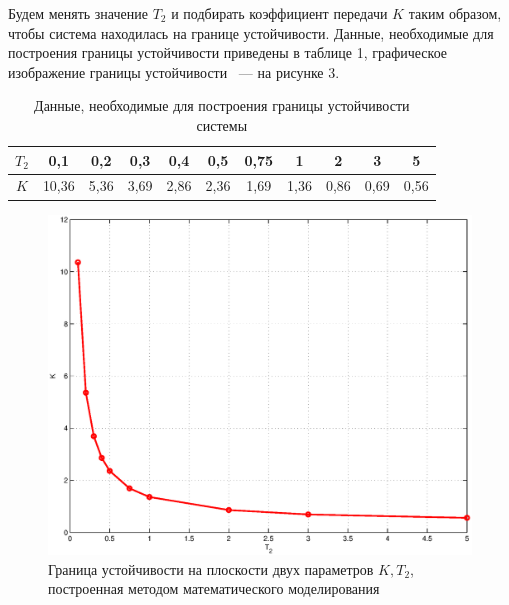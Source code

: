 \documentclass[12pt,a4paper]{article}
\begin{document}
Будем менять значение $T_2$ и подбирать коэффициент передачи $K$ таким образом, чтобы система находилась на границе устойчивости. Данные, необходимые для построения границы устойчивости приведены в таблице 1, графическое изображение границы устойчивости ~--- на рисунке 3.
\begin{table}[h!]
	\caption{Данные, необходимые для построения границы устойчивости системы}
	\renewcommand{\arraystretch}{1.8} %
	\begin{center}
		\begin{tabular}{|c|c|c|c|c|c|c|c|c|c|c|}
			\hline $T_2$ & 0,1 & 0,2 & 0,3 & 0,4 & 0,5 & 0,75 & 1 & 2 & 3 & 5\\
			\hline $K$ & 10,36 & 5,36 & 3,69 & 2,86 & 2,36 & 1,69 & 1,36 & 0,86 & 0,69 & 0,56\\
			\hline
		\end{tabular}	
	\end{center}	
\end{table} 
\begin{figure}[h!]
	\centering
	\includegraphics[width=0.8\linewidth]{scheme/plot0.eps}
	\caption{Граница устойчивости на плоскости двух параметров $K, T_2$, построенная методом математического моделирования}
\end{figure}
\end{document}
